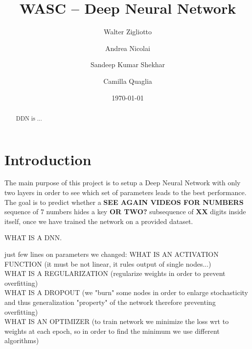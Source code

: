 \documentclass[prl,twocolumn]{revtex4-1}
\begin{document}
\title{WASC -- Deep Neural Network}





\author{Walter Zigliotto}
\author{Andrea Nicolai}
\author{Sandeep Kumar Shekhar}
\author{Camilla Quaglia}

\date{\today}


\begin{abstract}
DDN is ...




\end{abstract}

\maketitle


\section{Introduction}

The main purpose of this project is to setup a Deep Neural Network with only two layers in order to see which set of parameters leads to the best performance. The goal is to predict whether a \textbf{SEE AGAIN VIDEOS FOR NUMBERS} sequence of 7 numbers hides a key \textbf{OR TWO?} subsequence of \textbf{XX} digits inside itself, once we have trained the network on a provided dataset.

\medskip 

WHAT IS A DNN.\\

\medskip

just few lines on parameters we changed:
WHAT IS AN ACTIVATION FUNCTION (it must be not linear, it rules output of single nodes...)\\ 
WHAT IS A REGULARIZATION (regularize weights in order to prevent overfitting)\\
WHAT IS A DROPOUT (we "burn" some nodes in order to enlarge stochasticity and thus generalization "property" of the network therefore preventing overfitting)\\
WHAT IS AN OPTIMIZER (to train network we minimize the loss wrt to weights at each epoch, so in order to find the minimum we use different algorithms)\\
\end{document}
